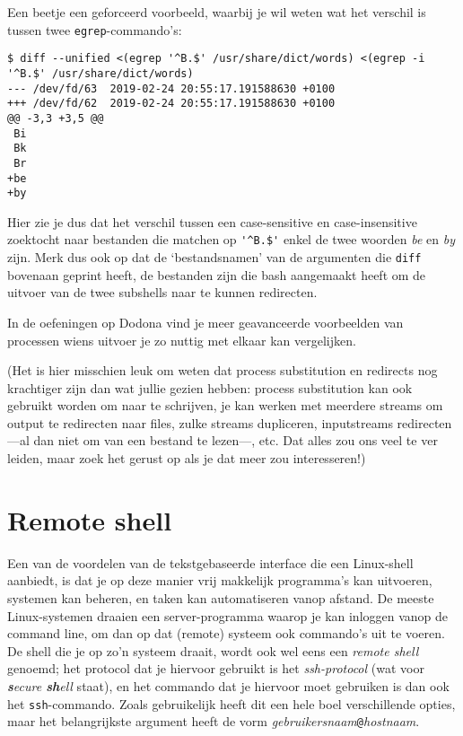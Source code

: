 \documentclass[a4paper,twoside,openany]{memoir}
\begin{document}
Een beetje een geforceerd voorbeeld, waarbij je wil weten wat het verschil is
tussen twee \verb!egrep!-commando's:

\begin{verbatim}
$ diff --unified <(egrep '^B.$' /usr/share/dict/words) <(egrep -i '^B.$' /usr/share/dict/words)
--- /dev/fd/63  2019-02-24 20:55:17.191588630 +0100
+++ /dev/fd/62  2019-02-24 20:55:17.191588630 +0100
@@ -3,3 +3,5 @@
 Bi
 Bk
 Br
+be
+by
\end{verbatim}

Hier zie je dus dat het verschil tussen een case-sensitive en case-insensitive
zoektocht naar bestanden die matchen op \verb!'^B.$'! enkel de twee woorden
\emph{be} en \emph{by} zijn. Merk dus ook op dat de `bestandsnamen' van de
argumenten die \verb!diff! bovenaan geprint heeft, de bestanden zijn die bash
aangemaakt heeft om de uitvoer van de twee subshells naar te kunnen redirecten.

In de oefeningen op Dodona vind je meer geavanceerde voorbeelden van processen
wiens uitvoer je zo nuttig met elkaar kan vergelijken.

(Het is hier misschien leuk om weten dat process substitution en redirects nog
krachtiger zijn dan wat jullie gezien hebben: process substitution kan ook
gebruikt worden om naar te schrijven, je kan werken met meerdere streams om
output te redirecten naar files, zulke streams dupliceren, inputstreams
redirecten---al dan niet om van een bestand te lezen---, etc. Dat alles zou ons
veel te ver leiden, maar zoek het gerust op als je dat meer zou interesseren!)

\chapter{Remote shell}

Een van de voordelen van de tekstgebaseerde interface die een Linux-shell
aanbiedt, is dat je op deze manier vrij makkelijk programma's kan uitvoeren,
systemen kan beheren, en taken kan automatiseren vanop afstand. De meeste
Linux-systemen draaien een server-programma waarop je kan inloggen vanop de
command line, om dan op dat (remote) systeem ook commando's uit te voeren. De
shell die je op zo'n systeem draait, wordt ook wel eens een \emph{remote shell}
genoemd; het protocol dat je hiervoor gebruikt is het \emph{ssh-protocol} (wat
voor \emph{\textbf{s}ecure \textbf{sh}ell} staat), en het commando dat je
hiervoor moet gebruiken is dan ook het \verb!ssh!-commando. Zoals gebruikelijk
heeft dit een hele boel verschillende opties, maar het belangrijkste argument
heeft de vorm \emph{gebruikersnaam}\verb!@!\emph{hostnaam}.
\end{document}
